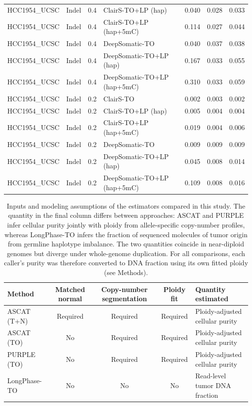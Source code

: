 \documentclass[pdflatex,sn-nature]{sn-jnl}
\begin{document}
{\begin{longtable}{@{}llllccc@{}}
  HCC1954\_UCSC & Indel & 0.4 & ClairS-TO+LP (hap) & 0.040 & 0.028 & 0.033 \\
  HCC1954\_UCSC & Indel & 0.4 & ClairS-TO+LP (hap+5mC) & 0.114 & 0.027 & 0.044 \\
  HCC1954\_UCSC & Indel & 0.4 & DeepSomatic-TO & 0.040 & 0.037 & 0.038 \\
  HCC1954\_UCSC & Indel & 0.4 & DeepSomatic-TO+LP (hap) & 0.167 & 0.033 & 0.055 \\
  HCC1954\_UCSC & Indel & 0.4 & DeepSomatic-TO+LP (hap+5mC) & 0.310 & 0.033 & 0.059 \\
  HCC1954\_UCSC & Indel & 0.2 & ClairS-TO & 0.002 & 0.003 & 0.002 \\
  HCC1954\_UCSC & Indel & 0.2 & ClairS-TO+LP (hap) & 0.005 & 0.004 & 0.004 \\
  HCC1954\_UCSC & Indel & 0.2 & ClairS-TO+LP (hap+5mC) & 0.019 & 0.004 & 0.006 \\
  HCC1954\_UCSC & Indel & 0.2 & DeepSomatic-TO & 0.009 & 0.009 & 0.009 \\
  HCC1954\_UCSC & Indel & 0.2 & DeepSomatic-TO+LP (hap) & 0.045 & 0.008 & 0.014 \\
  HCC1954\_UCSC & Indel & 0.2 & DeepSomatic-TO+LP (hap+5mC) & 0.109 & 0.008 & 0.016 \\
\end{longtable}
}



\begin{table}[htbp]
  \centering
  \footnotesize
  \caption[Inputs and modeling assumptions of the tumor DNA fraction estimators]%
  {Inputs and modeling assumptions of the estimators compared in this study. The quantity in the
  final column differs between approaches: ASCAT and PURPLE infer cellular purity jointly with
  ploidy from allele-specific copy-number profiles, whereas LongPhase-TO infers the fraction of
  sequenced molecules of tumor origin from germline haplotype imbalance. The two quantities coincide
  in near-diploid genomes but diverge under whole-genome duplication. For all comparisons, each
  caller's purity was therefore converted to DNA fraction using its own fitted ploidy (see Methods).}
  \label{tab:tdf-method-requirements}
  \begin{tabularx}{\textwidth}{@{}>{\raggedright\arraybackslash}p{}cccX@{}}
    \toprule
    Method & Matched normal & Copy-number segmentation & Ploidy fit & Quantity estimated \\
    \midrule
    ASCAT (T+N) & Required & Required & Required & Ploidy-adjusted cellular purity \\
    ASCAT (TO) & No & Required & Required & Ploidy-adjusted cellular purity \\
    PURPLE (TO) & No & Required & Required & Ploidy-adjusted cellular purity \\
    LongPhase-TO & No & No & No & Read-level tumor DNA fraction \\
    \bottomrule
  \end{tabularx}
\end{table}
\end{document}
